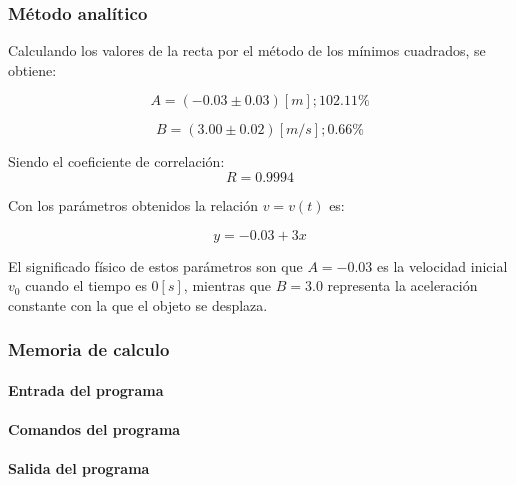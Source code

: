 \documentclass[letter,11pt]{article}
\begin{document}
\subsubsection{Método analítico}
Calculando los valores de la recta por el método de los mínimos cuadrados, se
obtiene:

\begin{equation*}
    A = (-0.03 \pm 0.03)[m];102.11\%
\end{equation*}

\begin{equation*}
    B = (3.00 \pm 0.02)[m/s];0.66\%
\end{equation*}

Siendo el coeficiente de correlación:
\begin{equation*}
    R = 0.9994
\end{equation*}

Con los parámetros obtenidos la relación $v = v(t)$ es:

\begin{equation}
    y = -0.03 + 3 x
\end{equation}

El significado físico de estos parámetros son que $A = -0.03$ es la velocidad
inicial $v_0$ cuando el tiempo es $0 [s]$, mientras que $B = 3.0$ representa la
aceleración constante con la que el objeto se desplaza.

\subsubsection{Memoria de calculo}

\paragraph{Entrada del programa}
\begin{alltt}
\footnotesize

\normalsize
\end{alltt}

\paragraph{Comandos del programa}
\begin{alltt}
\footnotesize

\normalsize
\end{alltt}

\paragraph{Salida del programa}
\begin{alltt}
\footnotesize

\normalsize
\end{alltt}
\end{document}
